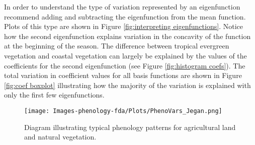 In order to understand the type of variation represented by an eigenfunction \cite{FDA} recommend adding and subtracting the eigenfunction from the mean function. Plots of this type are shown in Figure \ref{fig:interpreting eigenfunctions}. Notice how the second eigenfunction explains variation in the concavity of the function at the beginning of the season. The difference between tropical evergreen vegetation and coastal vegetation can largely be explained by the values of the coefficients for the second eigenfunction (see Figure \ref{fig:histogram coefs}). The total variation in coefficient values for all basis functions are shown in Figure \ref{fig:coef boxplot} illustrating how the majority of the variation is explained with only the first few eigenfunctions. 
\begin{figure}[htbp] 
	\centering 
	\texttt{[image: Images-phenology-fda/Plots/PhenoVars\_Jegan.png]} \caption{Diagram illustrating typical phenology patterns for agricultural land and natural vegetation. } \label{fig:phenology diagram} 
\end{figure}


